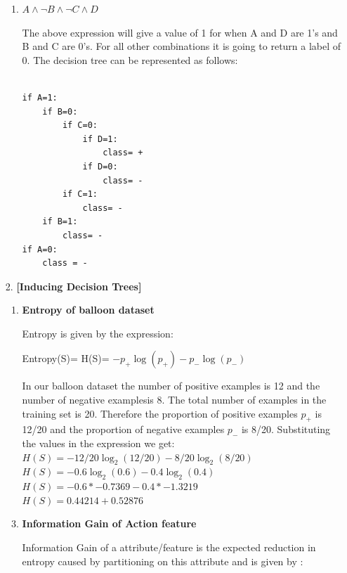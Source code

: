 \documentclass[11pt]{article}
\begin{document}
\begin{enumerate}
\begin{enumerate}
			\item $A \land \lnot B \land \lnot C \land D$
			
			The above expression will give a value of 1 for when A and D are 1's and B and C are 0's. For all other combinations it is going to return a label of 0. The decision tree can be represented as follows:
			
\begin{lstlisting}
			
if A=1:
	if B=0:
		if C=0:
			if D=1:
				class= +
			if D=0:
				class= -
		if C=1:
			class= -
	if B=1:
		class= -					
if A=0:
	class = -			
\end{lstlisting}
			
		\end{enumerate}	
		
		
		
		
		\item[2.] \textbf{[Inducing Decision Trees]} 
		
		\begin{enumerate}
			
			\item \textbf{Entropy of balloon dataset}
			
			\item[] Entropy is given by the expression:
			\begin{center}
				Entropy(S)= H(S)= $-p_+\log{(p_+)}	-p_-\log{(p_-)}$
			\end{center}
			
			In our balloon dataset the number of positive examples is 12 and the number of negative examplesis 8. The total number of examples in the training set is 20. Therefore the proportion of positive examples $p_+$ is 12/20 and the proportion of negative examples  $p_-$  is 8/20. Substituting the values in the expression we get:\\
			
			$H(S)= -12/20 \log_2{(12/20)}  -8/20 \log_2{(8/20)}$ \\
			$H(S)= -0.6 \log_2{(0.6)} -0.4\log_2{(0.4)}$\\
			$H(S)= -0.6 * -0.7369  -0.4*-1.3219$\\
			$H(S)= 0.44214 + 0.52876$\\
			
			\item \textbf{Information Gain of Action feature}
			
			Information Gain of a attribute/feature is the expected reduction in entropy caused by partitioning on this attribute and is given by : \\
			

\end{enumerate}
\end{enumerate}
\end{document}
